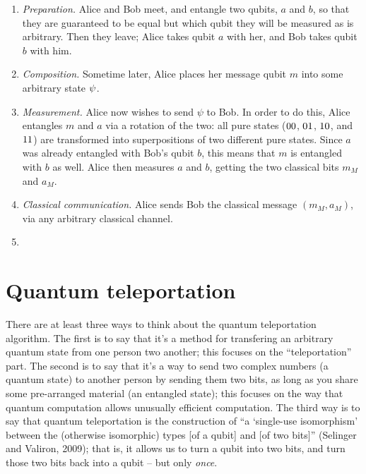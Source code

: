 \documentclass[12pt]{amsart}
\newif\ifdraft
\let\ket\relax
\newcommand{\asz}[1]{\ifdraft\textcolor{violet}{[ASZ: #1]}\fi}
\begin{document}
\begin{enumerate}
  \item \emph{Preparation.} Alice and Bob meet, and entangle two qubits, $a$ and
    $b$, so that they are guaranteed to be equal but which qubit they will be
    measured as is arbitrary.  Then they leave; Alice takes qubit $a$ with her,
    and Bob takes qubit $b$ with him.

  \item \emph{Composition.}  Sometime later, Alice places her message qubit $m$
    into some arbitrary state $\ket{\psi}$.\asz{I \emph{think} kets aren't only
    used for pure states.}

  \item \emph{Measurement.}  Alice now wishes to send $\psi$ to Bob.  In order
    to do this, Alice entangles $m$ and $a$ via a rotation\asz{check this
    terminology} of the two: all pure states ($\ket{00}$, $\ket{01}$,
    $\ket{10}$, and $\ket{11}$) are transformed into superpositions of two
    different pure states.  Since $a$ was already entangled with Bob's qubit
    $b$, this means that $m$ is entangled with $b$ as well.\asz{Should we split
    this next off into a separate step?}  Alice then measures $a$ and $b$,
    getting the two classical bits $m_M$ and $a_M$.

  \item \emph{Classical communication.}  Alice sends Bob the classical message
    $(m_M,a_M)$, via any arbitrary classical channel.

  \item \asz{I decided this isn't clear without the details.  Maybe I'll try
    explaining this to random victims -- er, friends -- and see how clear I can
    make it.} 
\end{enumerate}

\section{Quantum teleportation}\label{sec:teleportation}

There are at least three ways to think about the quantum teleportation
algorithm.  The first is to say that it's a method for transfering an arbitrary
quantum state from one person two another; this focuses on the ``teleportation''
part.  The second is to say that it's a way to send two complex numbers (a
quantum state) to another person by sending them two bits, as long as you share
some pre-arranged material (an entangled state); this focuses on the way that
quantum computation allows unusually efficient computation.  The third way is to
say that quantum teleportation is the construction of ``a `single-use
isomorphism' between the (otherwise isomorphic) types [of a qubit] and [of two
bits]''  (Selinger and Valiron, 2009\asz{reify this citation}); that is, it
allows us to turn a qubit into two bits, and turn those two bits back into a
qubit – but only \emph{once}.
\end{document}
